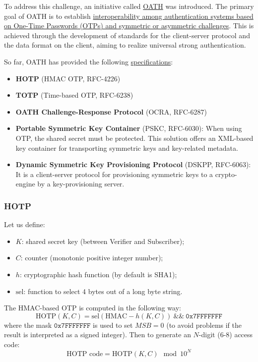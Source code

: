 To address this challenge, an initiative called \href{http://www.openauthentication.org/}{OATH} was introduced. The primary goal of OATH is to establish \ul{interoperability among authentication systems based on One-Time Passwords (OTPs) and symmetric or asymmetric challenges}. This is achieved through the development of standards for the client-server protocol and the data format on the client, aiming to realize universal strong authentication.

So far, OATH has provided the following \href{http://www.openauthentication.org/specifications}{specifications}:
\begin{itemize}
	\item \textbf{HOTP} (HMAC OTP, RFC-4226)
	\item \textbf{TOTP} (Time-based OTP, RFC-6238)
	\item \textbf{OATH Challenge-Response Protocol} (OCRA, RFC-6287)
	\item \textbf{Portable Symmetric Key Container} (PSKC, RFC-6030): When using OTP, the shared secret must be protected. This solution offers an XML-based key container for transporting symmetric keys and key-related metadata.
	\item \textbf{Dynamic Symmetric Key Provisioning Protocol} (DSKPP, RFC-6063): It is a client-server protocol for provisioning symmetric keys to a crypto-engine by a key-provisioning server.
\end{itemize}

\subsubsection{HOTP}

Let us define:
\begin{itemize}
	\item \(K\): shared secret key (between Verifier and Subscriber);
	\item \(C\): counter (monotonic positive integer number);
	\item \(h\): cryptographic hash function (by default is SHA1);
	\item \(\text{sel}\): function to select 4 bytes out of a long byte string.
\end{itemize}

The HMAC-based OTP is computed in the following way:
\[
	\text{HOTP}(K, C) = \text{sel}(\text{HMAC}-h(K, C)) \ \&\& \ \mathtt{0x7FFFFFFF}
\]
where the mask \(\mathtt{0x7FFFFFFF}\) is used to set \(MSB=0\) (to avoid problems if the result is interpreted as a signed integer). Then to generate an \(N\)-digit (6-8) access code:
\[
	\text{HOTP code} = \text{HOTP}(K, C) \mod 10^N
\]

